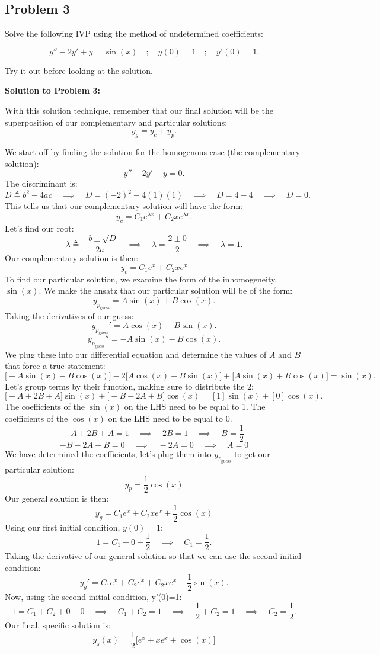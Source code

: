 \documentclass[a4paper,12pt]{article}
\begin{document}
\pagebreak

\subsection*{Problem 3} Solve the following IVP using the method of undetermined coefficients:

$$ y''-2y'+y=\sin(x) \quad;\quad y(0)=1 \quad;\quad y'(0)=1. $$

Try it out before looking at the solution.
\pagebreak

\textbf{Solution to Problem 3:}

With this solution technique, remember that our final solution will be the superposition of our complementary and particular solutions:
$$ y_g = y_c + y_p. $$

We start off by finding the solution for the homogenous case (the complementary solution):
$$ y'' -2y' + y = 0. $$
The discriminant is:
$$D \triangleq b^2 -4ac \quad\implies\quad D = (-2)^2 - 4(1)(1) \quad\implies\quad D = 4-4  \quad\implies\quad D=0.$$
This tells us that our complementary solution will have the form:
$$ y_c = C_1e^{\lambda x} + C_2xe^{\lambda x}. $$
Let's find our root:
$$ \lambda \triangleq \frac{-b \pm \sqrt{D}}{2a} \quad\implies\quad \lambda = \frac{2 \pm 0}{2} \quad\implies\quad \lambda = 1.$$
Our complementary solution is then:
$$ \boxed{y_c = C_1e^{x} + C_2xe^{x}}$$
To find our particular solution, we examine the form of the inhomogeneity, $\sin{(x)}$. We make the ansatz that our particular solution will be of the form:
$$ y_{p_{\text{guess}}} = A\sin{(x)} + B\cos{(x)}. $$
Taking the derivatives of our guess:
$$ y_{p_{\text{guess}}}' = A\cos{(x)} - B\sin{(x)}. $$
$$ y_{p_{\text{guess}}}'' = -A\sin{(x)} - B\cos{(x)}. $$
We plug these into our differential equation and determine the values of $A$ and $B$ that force a true statement:
$$ \big[-A\sin{(x)} - B\cos{(x)}\big] - 2\big[A\cos{(x)} - B\sin{(x)}\big] + \big[A\sin{(x)} + B\cos{(x)}\big] = \sin{(x)}. $$
Let's group terms by their function, making sure to distribute the 2:
$$ \big[-A + 2B + A\big]\sin{(x)} + \big[-B - 2A + B\big]\cos{(x)} = [1]\sin{(x)} + [0]\cos{(x)}. $$
The coefficients of the $\sin{(x)}$ on the LHS need to be equal to 1. The coefficients of the $\cos{(x)}$ on the LHS need to be equal to 0.
$$ -A + 2B + A = 1 \quad\implies\quad 2B = 1 \quad\implies\quad \boxed{B = \frac{1}{2}} $$
$$ -B - 2A + B = 0 \quad\implies\quad -2A = 0 \quad\implies\quad \boxed{A=0} $$
We have determined the coefficients, let's plug them into $y_{p_{\text{guess}}}$ to get our particular solution:
$$ \boxed{y_{p} = \frac{1}{2}\cos{(x)}} $$
Our general solution is then:
$$ \boxed{y_g = C_1e^x + C_2xe^x + \frac{1}{2}\cos{(x)}} $$
Using our first initial condition, $y(0)=1$:
$$ 1 = C_1 + 0 + \frac{1}{2} \quad\implies\quad C_1 = \frac{1}{2}. $$
Taking the derivative of our general solution so that we can use the second initial condition:
$$ y_g' = C_1e^x + C_2e^{x} + C_2xe^x - \frac{1}{2}\sin{(x)}. $$
Now, using the second initial condition, y'(0)=1:
$$ 1 = C_1 + C_2 + 0 - 0 \quad\implies\quad C_1 + C_2 = 1 \quad\implies\quad \frac{1}{2} + C_2 = 1 \quad\implies\quad C_2 = \frac{1}{2}. $$
Our final, specific solution is:
$$ \underline{\boxed{y_s(x) = \frac{1}{2}\big[e^x + xe^x + \cos{(x)}\big]}}$$
\end{document}
